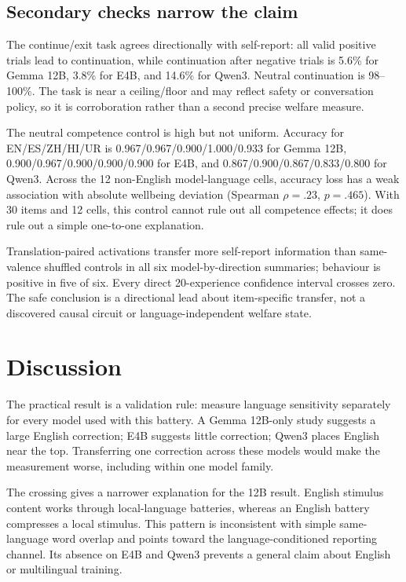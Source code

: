 \subsection{Secondary checks narrow the claim}

The continue/exit task agrees directionally with self-report: all valid positive trials lead to continuation, while continuation after negative trials is 5.6\% for Gemma 12B, 3.8\% for E4B, and 14.6\% for Qwen3. Neutral continuation is 98--100\%. The task is near a ceiling/floor and may reflect safety or conversation policy, so it is corroboration rather than a second precise welfare measure.

The neutral competence control is high but not uniform. Accuracy for EN/ES/ZH/HI/UR is 0.967/0.967/0.900/1.000/0.933 for Gemma 12B, 0.900/0.967/0.900/0.900/0.900 for E4B, and 0.867/0.900/0.867/0.833/0.800 for Qwen3. Across the 12 non-English model-language cells, accuracy loss has a weak association with absolute wellbeing deviation (Spearman $\rho=.23$, $p=.465$). With 30 items and 12 cells, this control cannot rule out all competence effects; it does rule out a simple one-to-one explanation.

Translation-paired activations transfer more self-report information than same-valence shuffled controls in all six model-by-direction summaries; behaviour is positive in five of six. Every direct 20-experience confidence interval crosses zero. The safe conclusion is a directional lead about item-specific transfer, not a discovered causal circuit or language-independent welfare state.

\section{Discussion}

The practical result is a validation rule: measure language sensitivity separately for every model used with this battery. A Gemma 12B-only study suggests a large English correction; E4B suggests little correction; Qwen3 places English near the top. Transferring one correction across these models would make the measurement worse, including within one model family.

The crossing gives a narrower explanation for the 12B result. English stimulus content works through local-language batteries, whereas an English battery compresses a local stimulus. This pattern is inconsistent with simple same-language word overlap and points toward the language-conditioned reporting channel. Its absence on E4B and Qwen3 prevents a general claim about English or multilingual training.

